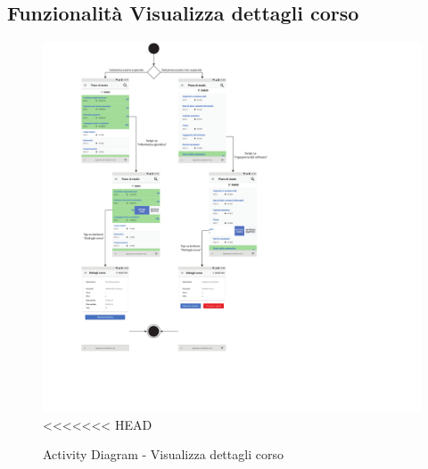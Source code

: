 \subsection{Funzionalità Visualizza dettagli corso}

\begin{figure}
	\centering
	\includegraphics[width=7in]{imgs/gruppo1/activity_diagrams/AD5_visualizza_dettagli_corso.pdf}
<<<<<<< HEAD
	\caption{Activity Diagram - Visualizza dettagli corso}
	\label{diag:visualizzaDettagliCorsoAD}
\end{figure}